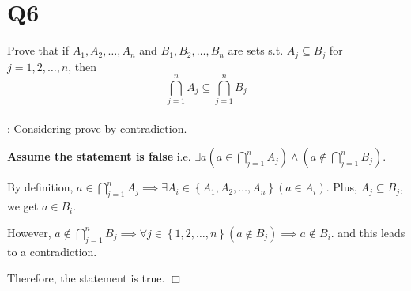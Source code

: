 \documentclass[11pt]{article}
\def\endproofmark{$\Box$}
\newenvironment{proof}{{\bf Proof}:}{\endproofmark\smallskip}
\begin{document}
\section*{Q6}
Prove that if $A_1,A_2, \ldots ,A_n$ and $B_1,B_2, \ldots ,B_n$ are sets
s.t. $A_j\subseteq B_j$ for $j=1,2, \ldots ,n$, then
\begin{equation*}
  \bigcap_{j=1}^nA_j \subseteq  \bigcap_{j=1}^nB_j
\end{equation*}\\
\begin{proof}
    Considering prove by contradiction.

    \textbf{Assume the statement is false} i.e.
    $\exists a (a\in \bigcap_{j=1}^nA_j ) 
    \land (a \notin \bigcap_{j=1}^n B_j )$.

    By definition, $a \in \bigcap_{j=1}^nA_j 
    \implies \exists A_i\in \left\{ A_1,A_2, \ldots ,A_n \right\}(a \in A_i)$. Plus, $A_j \subseteq B_j$, we get $a \in B_i$.

    However, $a \notin \bigcap_{j=1}^n B_j\implies
    \forall j\in \left\{ 1,2, \ldots ,n \right\}(a \notin B_j)
    \implies a\notin B_i$.
    and this leads to a contradiction. 

    Therefore, the statement is true.
\end{proof}
\end{document}
